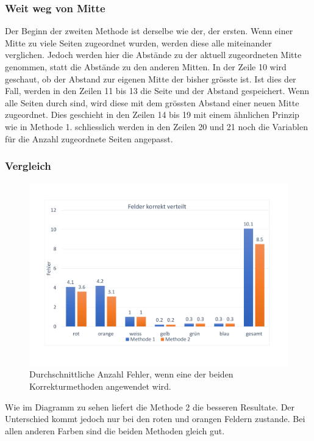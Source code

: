 \documentclass[a4paper, 12pt]{article}
\begin{document}
\subsubsection{Weit weg von Mitte}
Der Beginn der zweiten Methode ist derselbe wie der, der ersten. Wenn einer Mitte zu viele Seiten zugeordnet wurden, werden  diese alle miteinander verglichen. Jedoch werden hier die Abstände zu der aktuell zugeordneten Mitte genommen, statt die Abstände zu den anderen Mitten. In der Zeile 10 wird geschaut, ob der Abstand zur eigenen Mitte der bisher grösste ist. Ist dies der Fall, werden in den Zeilen 11 bis 13 die Seite und der Abstand gespeichert. Wenn alle Seiten durch sind, wird diese mit dem grössten Abstand einer neuen Mitte zugeordnet. Dies geschieht in den Zeilen 14 bis 19 mit einem ähnlichen Prinzip wie in Methode 1. schliesslich werden in den Zeilen 20 und 21 noch die Variablen für die Anzahl zugeordnete Seiten angepasst.

\subsubsection{Vergleich}
\begin{figure}[H]
\includegraphics[scale=0.4]{Felder_korrekt_verteilt}
\caption{Durchschnittliche Anzahl Fehler, wenn eine der beiden Korrekturmethoden angewendet wird.}
\end{figure}
Wie im Diagramm zu sehen liefert die Methode 2 die besseren Resultate. Der Unterschied kommt jedoch nur bei den roten und orangen Feldern zustande. Bei allen anderen Farben sind die beiden Methoden gleich gut. 
\newpage
\end{document}
